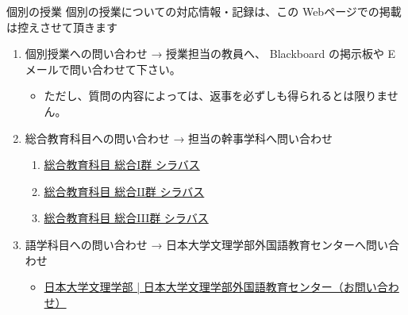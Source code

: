 \documentclass[a4j,10pt]{jsarticle}
\def\lthtmlcheckvsize{\ifdim\ht\sizebox<\vsize 
  \ifdim\wd\sizebox<\hsize\expandafter\hfill\fi \expandafter\vfill
  \else\expandafter\vss\fi}%
\begin{document}
{\newpage\clearpage
{}%
\begin{frame}[label={sec:orgb5859c3},fragile]{個別の授業}
個別の授業についての対応情報・記録は、この Webページでの掲載は控えさせて頂きます
\par
\begin{enumerate}
\item 個別授業への問い合わせ → 授業担当の教員へ、 Blackboard の掲示板や Eメールで問い合わせて下さい。
\begin{itemize}
\item ただし、質問の内容によっては、返事を必ずしも得られるとは限りません。
\end{itemize}
\par
\item 総合教育科目への問い合わせ → 担当の幹事学科へ問い合わせ
\begin{enumerate}
\item \href{https://syllabus.chs.nihon-u.ac.jp/op/list1\_1.html}{総合教育科目 総合I群 シラバス}
\item \href{https://syllabus.chs.nihon-u.ac.jp/op/list1\_2.html}{総合教育科目 総合II群 シラバス}
\item \href{https://syllabus.chs.nihon-u.ac.jp/op/list1\_3.html}{総合教育科目 総合III群 シラバス}
\end{enumerate}
\par
\item 語学科目への問い合わせ → 日本大学文理学部外国語教育センターへ問い合わせ
\begin{itemize}
\item \href{https://www.chs.nihon-u.ac.jp/contact/flec\_form/}{日本大学文理学部 | 日本大学文理学部外国語教育センター（お問い合わせ）}
\end{itemize}
\end{enumerate}
\end{frame}%
\lthtmlfigureZ
\lthtmlcheckvsize\clearpage}
\end{document}
